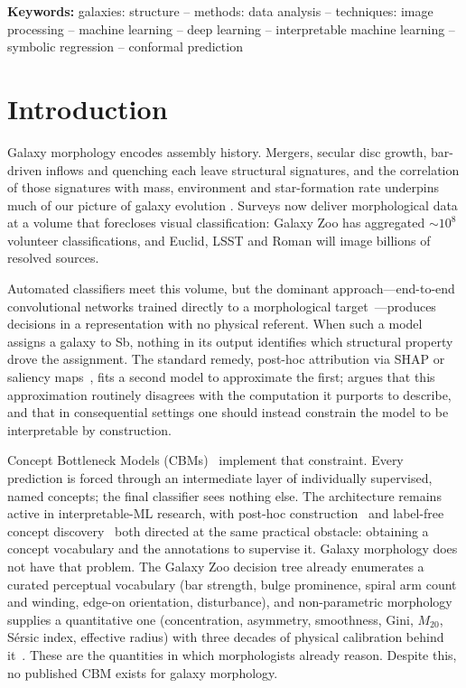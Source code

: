 \documentclass[11pt]{article}
\begin{document}
\vspace{4pt}
\noindent\textbf{Keywords:} galaxies: structure -- methods: data analysis -- techniques: image processing
-- machine learning -- deep learning -- interpretable machine learning --
symbolic regression -- conformal prediction


\section{Introduction}
\label{sec:intro}

Galaxy morphology encodes assembly history. Mergers, secular disc growth,
bar-driven inflows and quenching each leave structural signatures, and the
correlation of those signatures with mass, environment and star-formation rate
underpins much of our picture of galaxy evolution
\citep{hubble1926,conselice2014}. Surveys now deliver morphological data at a
volume that forecloses visual classification: Galaxy Zoo has aggregated
$\sim\!10^{8}$ volunteer classifications, and Euclid, LSST and Roman will
image billions of resolved sources.

Automated classifiers meet this volume, but the dominant approach---end-to-end
convolutional networks trained directly to a morphological
target~\citep{dieleman2015,dominguez2018,walmsley2022}---produces decisions in
a representation with no physical referent. When such a model assigns a galaxy
to Sb, nothing in its output identifies which structural property drove the
assignment. The standard remedy, post-hoc attribution via SHAP or saliency
maps~\citep{lundberg2017,smilkov2017}, fits a second model to approximate the
first; \citet{rudin2019} argues that this approximation routinely disagrees
with the computation it purports to describe, and that in consequential
settings one should instead constrain the model to be interpretable by
construction.

Concept Bottleneck Models (CBMs)~\citep{koh2020} implement that constraint. Every
prediction is forced through an intermediate layer of individually supervised,
named concepts; the final classifier sees nothing else. The architecture
remains active in interpretable-ML research, with post-hoc
construction~\citep{yuksekgonul2023} and label-free concept
discovery~\citep{oikarinen2023} both directed at the same practical
obstacle: obtaining a concept vocabulary and the annotations to supervise it.
Galaxy morphology does not have that problem. The Galaxy Zoo decision tree
already enumerates a curated perceptual
vocabulary (bar strength, bulge prominence, spiral arm count and winding,
edge-on orientation, disturbance), and non-parametric morphology supplies a
quantitative one (concentration, asymmetry, smoothness, Gini, $M_{20}$,
Sérsic index, effective radius) with three decades of physical calibration
behind it~\citep{conselice2003,lotz2004,rodriguez2019}. These are the
quantities in which morphologists already reason. Despite this, no published
CBM exists for galaxy morphology.
\end{document}
